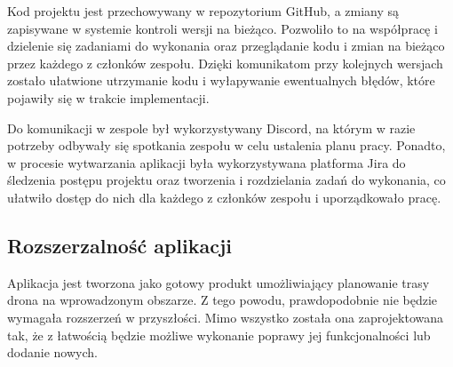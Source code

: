 Kod projektu jest przechowywany w repozytorium GitHub, a zmiany są zapisywane w systemie kontroli wersji na bieżąco. Pozwoliło to na współpracę i dzielenie się zadaniami do wykonania oraz przeglądanie kodu i zmian na bieżąco przez każdego z członków zespołu. Dzięki komunikatom przy kolejnych wersjach zostało ułatwione utrzymanie kodu i wyłapywanie ewentualnych błędów, które pojawiły się w trakcie implementacji.

Do komunikacji w zespole był wykorzystywany Discord, na którym w razie potrzeby odbywały się spotkania zespołu w celu ustalenia planu pracy. Ponadto, w procesie wytwarzania aplikacji była wykorzystywana platforma Jira do śledzenia postępu projektu oraz tworzenia i rozdzielania zadań do wykonania, co ułatwiło dostęp do nich dla każdego z członków zespołu i uporządkowało pracę.

\subsection{Rozszerzalność aplikacji}

Aplikacja jest tworzona jako gotowy produkt umożliwiający planowanie trasy drona na wprowadzonym obszarze. Z tego powodu, prawdopodobnie nie będzie wymagała rozszerzeń w przyszłości. Mimo wszystko została ona zaprojektowana tak, że z łatwością będzie możliwe wykonanie poprawy jej funkcjonalności lub dodanie nowych.